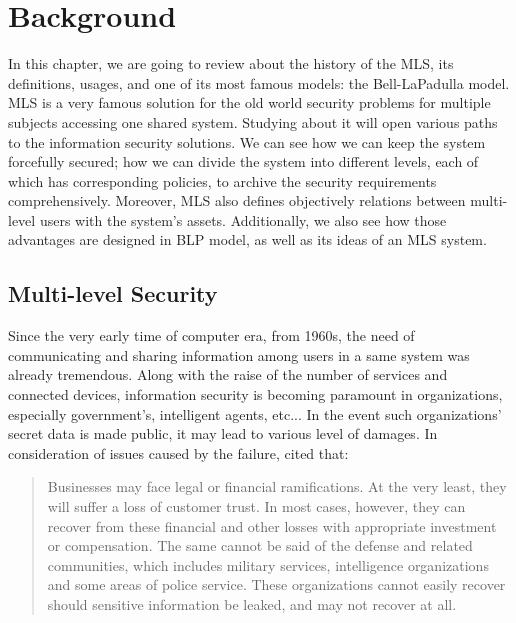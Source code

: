 ﻿%

\chapter{Background} %

\label{ch:background} %


In this chapter, we are going to review about the history of the MLS, its definitions, usages, and one of its most famous models: the Bell-LaPadulla model.
MLS is a very famous solution for the old world security problems for multiple subjects accessing one shared system. 
Studying about it will open various paths to the information security solutions.
We can see how we can keep the system forcefully secured; 
how we can divide the system into different levels, each of which has corresponding policies, to archive the security requirements comprehensively.
Moreover, MLS also defines objectively relations between multi-level users with the system's assets. 
Additionally, we also see how those advantages are designed in BLP model, as well as its ideas of an MLS system.


\section{Multi-level Security}
\label{ch:background:mls}

Since the very early time of computer era, from 1960s, the need of communicating and sharing information among users in a same system was already tremendous.
Along with the raise of the number of services and connected devices, information security is becoming paramount in organizations, especially government's, intelligent agents, etc...
In the event such organizations' secret data is made public, it may lead to various level of damages.
In consideration of issues caused by the failure, \citeauthor{centos:2008} cited that:

\begin{quote}
Businesses may face legal or financial ramifications. At the very least, they will suffer a loss of customer trust. 
In most cases, however, they can recover from these financial and other losses with appropriate investment or compensation. 
The same cannot be said of the defense and related communities, which includes military services, intelligence organizations and some areas of police service.
These organizations cannot easily recover should sensitive information be leaked, and may not recover at all. 
\end{quote}

